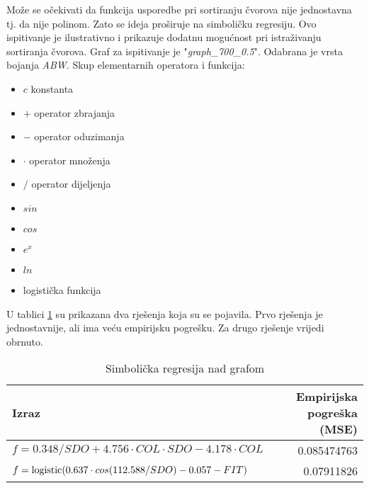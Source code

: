 \documentclass[times, utf8, diplomski, numeric]{fer}
\begin{document}
Može se očekivati da funkcija usporedbe pri sortiranju čvorova nije jednostavna tj. da nije polinom. Zato se ideja proširuje na simboličku regresiju. Ovo ispitivanje je ilustrativno i prikazuje dodatnu mogućnost pri istraživanju sortiranja čvorova. Graf za ispitivanje je "\emph{graph\_700\_0.5}". Odabrana je vrsta bojanja \emph{ABW}. Skup elementarnih operatora i funkcija:

\begin{itemize}
	\item $c$  konstanta
	\item $+$ operator zbrajanja
	\item $-$ operator oduzimanja
	\item $\cdot $ operator množenja
	\item $/$ operator dijeljenja
	\item $sin$
	\item $cos$
	\item $e^x$
	\item $ln$ 
	\item logistička funkcija
\end{itemize} 

U tablici \ref{tbl:sym-reg} su prikazana dva rješenja koja su se pojavila. Prvo rješenja je jednostavnije, ali ima veću empirijsku pogrešku. Za drugo rješenje vrijedi obrnuto.

\begin{table}[htb]
	\caption{Simbolička regresija nad grafom}
	\label{tbl:sym-reg}
	\centering
	\begin{tabular}{|l|r|} \hline
	Izraz & Empirijska pogreška (MSE)\\ \hline \hline
	$f = 0.348/SDO + 4.756\cdot COL \cdot SDO - 4.178\cdot COL$ & 0.085474763\\ \hline
	$f = \textup{logistic}(0.637\cdot cos(112.588/SDO) - 0.057 - FIT)$ & 0.07911826 \\ \hline
	\end{tabular}
\end{table}
\end{document}

